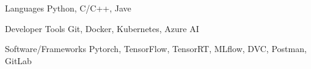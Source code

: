

\begin{cvskills}
  \cvskill
    {Languages} %
    {Python, C/C++, Jave} %


  \cvskill
    {Developer Tools} %
    {Git, Docker, Kubernetes, Azure AI} %

  \cvskill
    {Software/Frameworks} %
    {Pytorch, TensorFlow, TensorRT, MLflow, DVC, Postman, GitLab} %


\end{cvskills}
